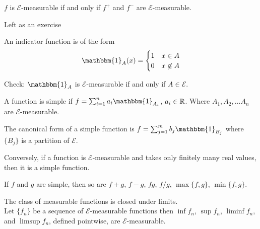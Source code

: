 \documentclass[12pt, titlepage]{article}
\begin{document}
\begin{lem}[]{}
	$f$ is $\mathcal{E}$-measurable if and only if $f^+$ and $f^-$ are $\mathcal{E}$-measurable.
\end{lem}

\begin{prf}
	Left as an exercise
\end{prf}

\begin{dfn}{}
	An indicator function is of the form
	\[\mathbbm{1}_A(x) =
	\begin{cases}
	1 & x \in A\\
	0 & x \not \in A
	\end{cases}\]
\end{dfn}

Check: $\mathbbm{1}_A$ is $\mathcal{E}$-measurable if and only if $A \in \mathcal{E}$.\\

\begin{dfn}{}
	A function is simple if $f = \sum_{i = 1}^n a_i \mathbbm{1}_{A_i}$, $a_i \in \mathbb{R}$. Where $A_1, A_2, \dots A_n$ are $\mathcal{E}$-measurable.\\
\end{dfn}

\begin{dfn}
	The canonical form of a simple function is $f = \sum_{j = 1}^m b_j \mathbbm{1}_{B_j}$ where $\{B_j\}$ is a partition of $\mathcal{E}$.\\
\end{dfn}

\begin{info}[]{}
	Conversely, if a function is $\mathcal{E}$-measurable and takes only finitely many real values, then it is a simple function.
\end{info}

\begin{info}[]{}
	If $f$ and $g$ are simple, then so are $f+g$, $f-g$, $fg$, $f/g$, $\max\{f, g\}$, $\min\{f, g\}$.\\
\end{info}

\begin{theo}[]{}
	The class of measurable functions is closed under limits.\\
	
	Let $\{f_n\}$ be a sequence of $\mathcal{E}$-measurable functions then $\inf f_n$, $\sup f_n$, $\liminf f_n$, and $\limsup f_n$, defined pointwise, are $\mathcal{E}$-measurable.
\end{theo}
\end{document}
